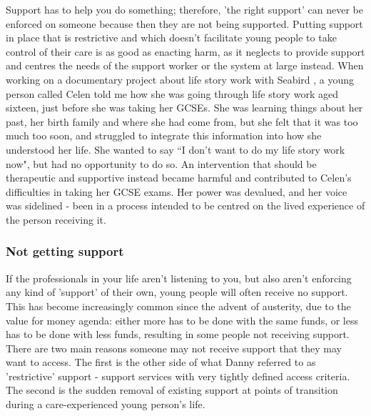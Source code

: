 Support has to help you do something; therefore, 'the right support' can never be enforced on someone because then they are not being supported. Putting support in place that is restrictive and which doesn't facilitate young people to take control of their care is as good as enacting harm, as it neglects to provide support and centres the needs of the support worker or the system at large instead.  When working on a documentary project about life story work with Seabird , a young person called Celen told me how she was going through life story work aged sixteen, just before she was taking her GCSEs. She was learning things about her past, her birth family and where she had come from, but she felt that it was too much too soon, and struggled to integrate this information into how she understood her life. She wanted to say “I don't want to do my life story work now", but had no opportunity to do so. An intervention that should be therapeutic and supportive instead became harmful and contributed to Celen’s difficulties in taking her GCSE exams. Her power was devalued, and her voice was sidelined - been in a process intended to be centred on the lived experience of the person receiving it.

\subsubsection{Not getting support}
If the professionals in your life aren't listening to you, but also aren’t enforcing any kind of 'support' of their own, young people will often receive no support. This has become increasingly common since the advent of austerity, due to the value for money agenda: either more has to be done with the same funds, or less has to be done with less funds, resulting in some people not receiving support. There are two main reasons someone may not receive support that they may want to access. The first is the other side of what Danny referred to as 'restrictive' support - support services with very tightly defined access criteria. The second is the sudden removal of existing support at points of transition during a care-experienced young person's life.

